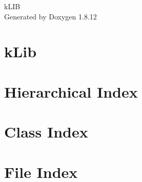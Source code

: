 \documentclass[twoside]{book}
\newcommand{\+}{\discretionary{\mbox{\scriptsize$\hookleftarrow$}}{}{}}
\newcommand{\clearemptydoublepage}{%
  \newpage{\pagestyle{empty}\cleardoublepage}%
}
\begin{document}
\hypersetup{pageanchor=false,
             bookmarksnumbered=true,
             pdfencoding=unicode
            }
\begin{titlepage}
\vspace*{7cm}
\begin{center}%
{\Large k\+L\+IB }\\
\vspace*{1cm}
{\large Generated by Doxygen 1.8.12}\\
\end{center}
\end{titlepage}
\clearemptydoublepage
{}
\tableofcontents
\clearemptydoublepage
{}
\hypersetup{pageanchor=true}

\chapter{k\+Lib}
\label{md_README}
\hypertarget{md_README}{}

\chapter{Hierarchical Index}

\chapter{Class Index}

\chapter{File Index}

\end{document}
